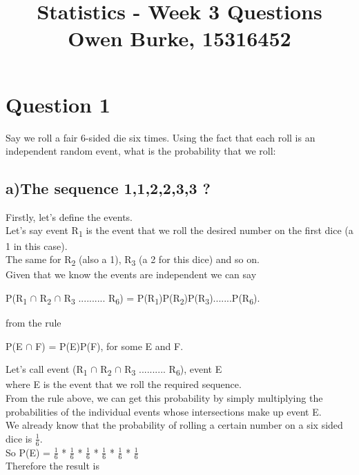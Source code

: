 \documentclass{report}
\title{\textbf{Statistics - Week 3 Questions}\\Owen Burke, 15316452}
\begin{document}
	\maketitle
	\section*{\hfil Question 1 \hfil}
	Say we roll a fair 6-sided die six times. Using the fact that each roll is an independent random event, what is the probability that we roll:
		\subsection*{a)The sequence 1,1,2,2,3,3 ?}
		
		Firstly, let's define the events.\\
		Let's say event R\textsubscript{1} is the event that we roll the desired number on the first dice (a 1 in this case).\\
		The same for R\textsubscript{2} (also a 1), R\textsubscript{3} (a 2 for this dice) and so on.\\
		Given that we know the events are independent we can say
		
		\begin{center}
			P(R\textsubscript{1} $\cap$ R\textsubscript{2} $\cap$ R\textsubscript{3} .......... R\textsubscript{6}) = P(R\textsubscript{1})P(R\textsubscript{2})P(R\textsubscript{3}).......P(R\textsubscript{6}).
		\end{center}

		from the rule 

		\begin{center}
			P(E $\cap$ F) = P(E)P(F), for some E and F.
		\end{center}

		Let's call event (R\textsubscript{1} $\cap$ R\textsubscript{2} $\cap$ R\textsubscript{3} .......... R\textsubscript{6}), event E\\
		where E is the event that we roll the required sequence.\\
		From the rule above, we can get this probability by simply multiplying the probabilities of the individual events whose intersections make up event E.\\
		We already know that the probability of rolling a certain number on a six sided dice is $\frac{1}{6}$.\\
		So P(E) = $\frac{1}{6}$ * $\frac{1}{6}$ * $\frac{1}{6}$ * $\frac{1}{6}$ * $\frac{1}{6}$ * $\frac{1}{6}$\\
		Therefore the result is 
\end{document}
